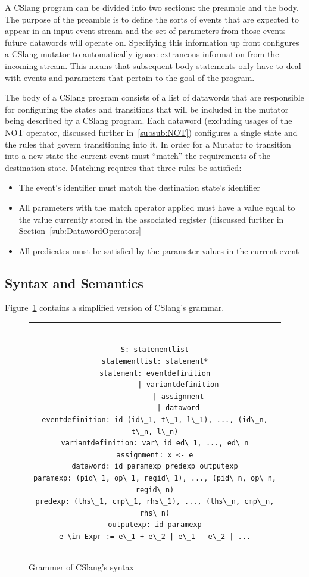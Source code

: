 A CSlang program can be divided into two sections: the preamble and the body.
The purpose of the preamble is to define the sorts of events that are
expected
to appear in an input event stream and the set of parameters from those
events future datawords will operate on.  Specifying this information up
front configures a CSlang mutator to
automatically ignore extraneous information from the incoming stream.  This
means that subsequent body statements only have to deal with events and
parameters that pertain to the goal of the program.

The body of a CSlang program consists of a list of datawords that
are responsible for configuring the states and transitions
that will be included in the mutator being described by a CSlang program.
Each dataword (excluding usages of the NOT operator, discussed further
in~\ref{subsub:NOT}) configures a single
state and the rules that govern transitioning into it.
In order for a Mutator to transition into a new state
the current event must ``match'' the requirements of the destination state.
 Matching requires that three rules be satisfied:

\begin{itemize}
\item{The event's identifier must match the destination state's identifier}
\item{All parameters with the match operator applied must have a value equal to
  the value currently stored in the associated register (discussed further
    in Section~\ref{sub:DatawordOperators}}
\item{All predicates must be satisfied by the parameter values in the
  current event}
\end{itemize}




\subsection{Syntax and Semantics}
\label{sub:SyntaxAndSemantics}

Figure~\ref{lst:SyntaxGrammar} contains a simplified
version of CSlang's grammar.

\begin{figure}[H]
\centering
\begin{tabular}{c}
\begin{lstlisting}

S: statementlist
statementlist: statement*
statement: eventdefinition
           | variantdefinition
           | assignment
           | dataword
eventdefinition: id (id\_1, t\_1, l\_1), ..., (id\_n, t\_n, l\_n)
variantdefinition: var\_id ed\_1, ..., ed\_n
assignment: x <- e
dataword: id paramexp predexp outputexp
paramexp: (pid\_1, op\_1, regid\_1), ..., (pid\_n, op\_n, regid\_n)
predexp: (lhs\_1, cmp\_1, rhs\_1), ..., (lhs\_n, cmp\_n, rhs\_n)
outputexp: id paramexp
e \in Expr := e\_1 + e\_2 | e\_1 - e\_2 | ...
\end{lstlisting}
\end{tabular}
\caption{Grammer of CSlang's syntax}
\label{lst:SyntaxGrammar}
\end{figure}


